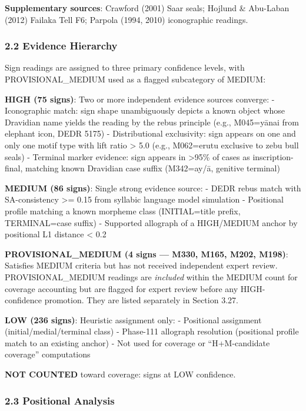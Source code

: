 \documentclass[
]{article}
\begin{document}
\textbf{Supplementary sources}: Crawford (2001) Saar seals; Hojlund \&
Abu-Laban (2012) Failaka Tell F6; Parpola (1994, 2010) iconographic readings.

\subsubsection{2.2 Evidence Hierarchy}\label{evidence-hierarchy}

Sign readings are assigned to three primary confidence levels, with PROVISIONAL\_MEDIUM used as a flagged subcategory of MEDIUM:

\textbf{HIGH (75 signs)}: Two or more independent evidence sources
converge: - Iconographic match: sign shape unambiguously depicts a known
object whose Dravidian name yields the reading by the rebus principle
(e.g., M045=yānai from elephant icon, DEDR 5175) - Distributional
exclusivity: sign appears on one and only one motif type with lift ratio
\textgreater{} 5.0 (e.g., M062=erutu exclusive to zebu bull seals) -
Terminal marker evidence: sign appears in \textgreater95\% of cases as
inscription-final, matching known Dravidian case suffix (M342=ay/ā,
genitive terminal)

\textbf{MEDIUM (86 signs)}: Single strong evidence source: - DEDR rebus
match with SA-consistency \textgreater{}= 0.15 from syllabic language model simulation
- Positional profile matching a known morpheme class (INITIAL=title
prefix, TERMINAL=case suffix) - Supported allograph of a HIGH/MEDIUM
anchor by positional L1 distance \textless{} 0.2


\textbf{PROVISIONAL\_MEDIUM (4 signs --- M330, M165, M202, M198)}: Satisfies MEDIUM criteria
but has not received independent expert review. PROVISIONAL\_MEDIUM readings are
\emph{included} within the MEDIUM count for coverage accounting but are flagged for
expert review before any HIGH-confidence promotion. They are listed separately in
Section 3.27.

\textbf{LOW (236 signs)}: Heuristic assignment only: - Positional
assignment (initial/medial/terminal class) - Phase-111 allograph
resolution (positional profile match to an existing anchor) - Not used
for coverage or ``H+M-candidate coverage'' computations

\textbf{NOT COUNTED} toward coverage: signs at LOW confidence.

\subsubsection{2.3 Positional Analysis}\label{positional-analysis}
\end{document}
